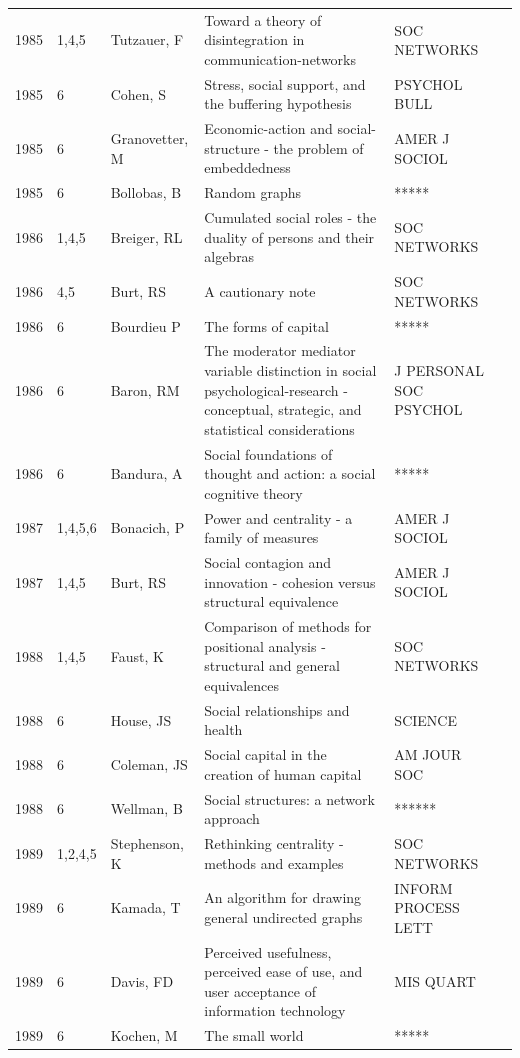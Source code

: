 \documentclass[11pt]{article} %
\begin{document}
\begin{longtable}{p{0.8cm}|p{1.25cm}|p{2.8cm}|p{7.5cm}|p{3cm}l}
1985&	1,4,5&	Tutzauer, F&	 Toward a theory of disintegration in communication-networks&         	SOC NETWORKS\\
1985&	6&	Cohen, S&	 Stress, social support, and the buffering hypothesis&         	PSYCHOL BULL\\
1985&	6&	Granovetter, M&	 Economic-action and social-structure - the problem of embeddedness&         	AMER J SOCIOL\\
1985&	6&	Bollobas, B&	 Random graphs&         	*****\\
1986&	1,4,5&	Breiger, RL&	 Cumulated social roles - the duality of persons and their algebras&         	SOC NETWORKS\\
1986&	4,5&	Burt, RS&	 A cautionary note&         	SOC NETWORKS\\
1986&	6&	Bourdieu P &	The forms of capital&         	*****\\
1986&	6&	Baron, RM&	 The moderator mediator variable distinction in social psychological-research - conceptual, strategic, and statistical considerations&         	J PERSONAL SOC PSYCHOL\\
1986&	6&	Bandura, A&	Social foundations of thought and action: a social cognitive theory&         	*****\\
1987&	1,4,5,6&	Bonacich, P&	 Power and centrality - a family of measures&         	AMER J SOCIOL\\
1987&	1,4,5&	Burt, RS&	 Social contagion and innovation - cohesion versus structural equivalence&         	AMER J SOCIOL\\
1988&	1,4,5&	Faust, K&	 Comparison of methods for positional analysis - structural and general equivalences&         	SOC NETWORKS\\
1988&	6&	House, JS&	 Social relationships and health&         	SCIENCE\\
1988&	6&	Coleman, JS&	Social capital in the creation of human capital&         	AM JOUR SOC\\
1988&	6&	Wellman, B&	Social structures: a network approach&         	******\\
1989&	1,2,4,5&	Stephenson, K&	 Rethinking centrality - methods and examples&         	SOC NETWORKS\\
1989&	6&	Kamada, T&	 An algorithm for drawing general undirected graphs&         	INFORM PROCESS LETT\\
1989&	6&	Davis, FD&	 Perceived usefulness, perceived ease of use, and user acceptance of information technology&         	MIS QUART\\
1989&	6&	Kochen, M &	The small world&         	*****\\

\end{longtable}
\end{document}
